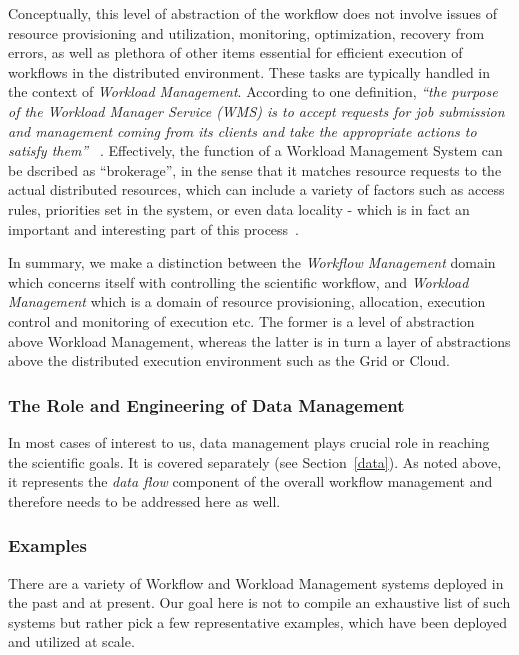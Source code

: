 Conceptually, this level of abstraction of the workflow does not  involve issues of resource provisioning and utilization, monitoring, optimization, recovery from errors, as well as plethora of other items essential
for efficient execution of workflows in the distributed environment. These tasks are typically handled in the context of \textit{Workload Management}. According to one definition, \textit{``the purpose of the Workload Manager Service (WMS) is to accept requests for job submission and
management coming from its clients and take the appropriate actions to satisfy them''} ~\cite{egee_user_guide}. Effectively, the function of a Workload Management System can be dscribed as ``brokerage'', in the sense that it matches resource requests to the actual distributed resources, which can include a variety of factors such as access rules, priorities set in the system, or even data locality - which is in fact an important and interesting part of this process~\cite{panda_chep11}.

In summary, we make a distinction between the \textit{Workflow Management} domain which concerns itself with controlling the scientific workflow, and \textit{Workload Management} which is a domain of resource provisioning, allocation, execution control and monitoring of execution etc. The former is a level of abstraction above Workload Management, whereas the latter is in turn a layer of abstractions above the distributed execution environment such as the Grid or Cloud.



\subsubsection{The Role and Engineering of Data Management}
In most cases of interest to us, data management plays crucial role in reaching the scientific goals. It is covered separately (see Section~\ref{data}). As noted above, it represents the \textit{data flow} component of the overall workflow management and therefore needs to be addressed here as well.

\subsubsection{Examples}
There are a variety of Workflow and Workload Management systems deployed in the past and at present. Our goal here is not to compile an exhaustive list of such systems but rather pick a few representative examples, which have been deployed and utilized at scale.


